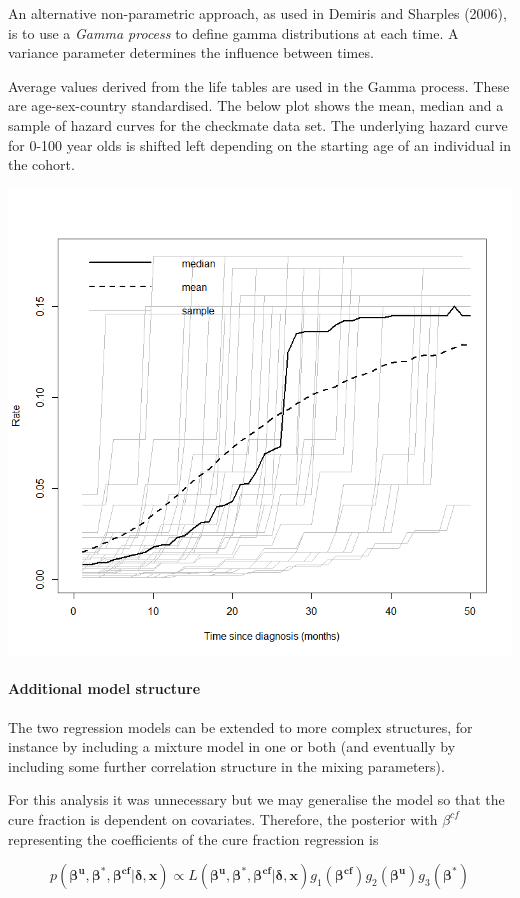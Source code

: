 \documentclass[
]{article}
\begin{document}
An alternative non-parametric approach, as used in Demiris and Sharples
(2006), is to use a \emph{Gamma process} to define gamma distributions
at each time. A variance parameter determines the influence between
times.

Average values derived from the life tables are used in the Gamma
process. These are age-sex-country standardised. The below plot shows
the mean, median and a sample of hazard curves for the checkmate data
set. The underlying hazard curve for 0-100 year olds is shifted left
depending on the starting age of an individual in the cohort.

\begin{center}\includegraphics[width=0.6\linewidth]{../docs/background_average_rate_plot} \end{center}

\hypertarget{additional-model-structure}{%
\paragraph{Additional model
structure}\label{additional-model-structure}}

The two regression models can be extended to more complex structures,
for instance by including a mixture model in one or both (and eventually
by including some further correlation structure in the mixing
parameters).

For this analysis it was unnecessary but we may generalise the model so
that the cure fraction is dependent on covariates. Therefore, the
posterior with \(\beta^{cf}\) representing the coefficients of the cure
fraction regression is

\[
p(\boldsymbol{\beta^u},\boldsymbol{\beta^*}, \boldsymbol{\beta^{cf}} | \boldsymbol{\delta}, \boldsymbol{x}) \propto L(\boldsymbol{\beta^u},\boldsymbol{\beta^*}, \boldsymbol{\beta^{cf}} | \boldsymbol{\delta}, \boldsymbol{x}) g_1(\boldsymbol{\beta^{cf}})  g_2(\boldsymbol{\beta^u}) g_3(\boldsymbol{\beta^*})
\]
\end{document}
